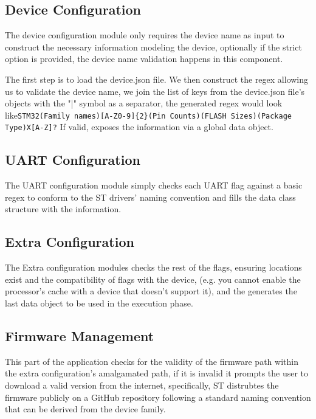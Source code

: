 \subsection{Device Configuration}
The device configuration module only requires the device name as input to construct the necessary information modeling the device, optionally if the strict option is provided, the device name validation happens in this component. \par \noindent
The first step is to load the device.json file. We then construct the regex allowing us to validate the device name, we join the list of keys from the device.json file's objects with the "|" symbol as a separator, the generated regex would look like\newline\texttt{STM32(Family names)[A-Z0-9]\{2\}(Pin Counts)(FLASH Sizes)(Package Type)X[A-Z]?} \newline If valid, exposes the information via a global data object.
\subsection{UART Configuration}
The UART configuration module simply checks each UART flag against a basic regex to conform to the ST drivers' naming convention and fills the data class structure with the information.
\subsection{Extra Configuration}
The Extra configuration modules checks the rest of the flags, ensuring locations exist and the compatibility of flags with the device, (e.g. you cannot enable the processor's cache with a device that doesn't support it), and the generates the last data object to be used in the execution phase.
\subsection{Firmware Management}
This part of the application checks for the validity of the firmware path within the extra configuration's amalgamated path, if it is invalid it prompts the user to download a valid version from the internet, specifically, ST distrubtes the firmware publicly on a GitHub repository following a standard naming convention that can be derived from the device family.
